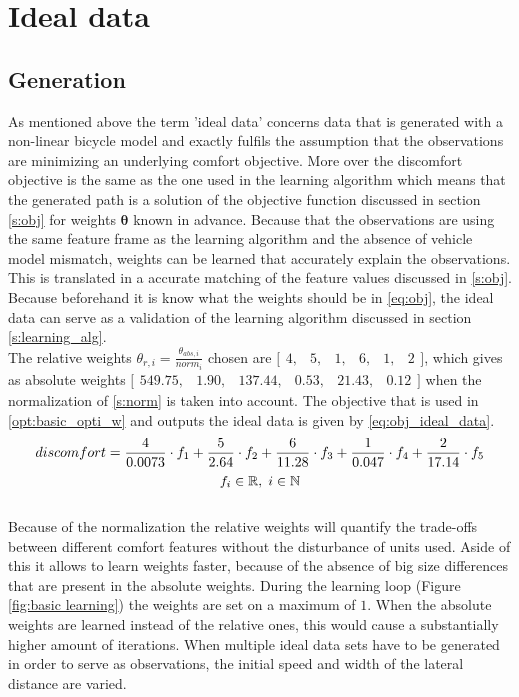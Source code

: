 \section{Ideal data} \label{s:GD}
\subsection{Generation}
As mentioned above the term 'ideal data' concerns data that is generated with a non-linear bicycle model and exactly fulfils the assumption that the observations are minimizing an underlying comfort objective. More over the discomfort objective is the same as the one used in the learning algorithm which means that the generated path is a solution of the objective function discussed in section \ref{s:obj} for weights $\bm{\theta}$ known in advance. Because that the observations are using the same feature frame as the learning algorithm and the absence of vehicle model mismatch, weights can be learned that accurately explain the observations. This is translated in a accurate matching of the feature values discussed in \ref{s:obj}. Because beforehand it is know what the weights should be in \ref{eq:obj}, the ideal data can serve as a validation of the learning algorithm discussed in section \ref{s:learning_alg}.\\


The relative weights $\theta_{r,i} = \frac{\theta_{abs,i}}{norm_i}$ chosen are $ \bigl[ \begin{smallmatrix} 4,&5,&1,&6,&1,&2\end{smallmatrix}\bigr]$, which gives as absolute weights  $ \bigl[ \begin{smallmatrix} 549.75, &1.90, &137.44  ,&0.53,  &21.43, &0.12\end{smallmatrix}\bigr]$ when the normalization of \ref{s:norm} is taken into account. The objective that is used in \ref{opt:basic_opti_w} and outputs the ideal data is given by \ref{eq:obj_ideal_data}. 
\begin{equation}\label{eq:obj_ideal_data}
discomfort = \frac{4}{0.0073} \cdot f_1 +\frac{5}{2.64} \cdot f_2 +\frac{6}{11.28} \cdot f_3 +\frac{1}{0.047} \cdot f_4 +\frac{2}{17.14} \cdot f_5 \\
\end{equation}
\[	f_i \in \mathbb{R}, \hspace{1mm}
i \in \mathbb{N}\]\\

Because of the normalization the relative weights will quantify the trade-offs between different comfort features without the disturbance of units used. Aside of this it allows to learn weights faster, because of the absence of big size differences that are present in the absolute weights. During the learning loop (Figure \ref{fig:basic learning}) the weights are set on a maximum of $1$. When the absolute weights are learned instead of the relative ones, this would cause a substantially higher amount of iterations.  When multiple ideal data sets have to be generated in order to serve as observations, the initial speed and width of the lateral distance are varied.\\

